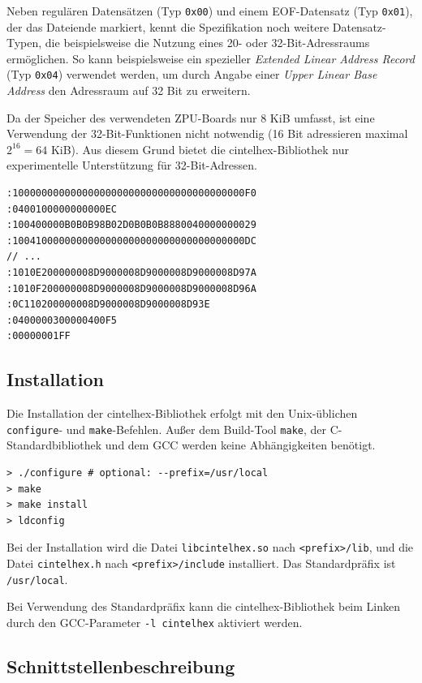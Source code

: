 \documentclass[11pt]{scrartcl}
\begin{document}
Neben regulären Datensätzen (Typ \texttt{0x00}) und einem EOF-Datensatz (Typ \texttt{0x01}), der das Dateiende markiert, kennt die Spezifikation noch weitere Datensatz-Typen, die beispielsweise die Nutzung eines 20- oder 32-Bit-Adressraums ermöglichen. So kann beispielsweise ein spezieller \emph{Extended Linear Address Record} (Typ \texttt{0x04}) verwendet werden, um durch Angabe einer \emph{Upper Linear Base Address} den Adressraum auf 32 Bit zu erweitern.

Da der Speicher des verwendeten ZPU-Boards nur 8 KiB umfasst, ist eine Verwendung der 32-Bit-Funktionen nicht notwendig (16 Bit adressieren maximal $2^{16} = 64$ KiB). Aus diesem Grund bietet die cintelhex-Bibliothek nur experimentelle Unterstützung für 32-Bit-Adressen.

\begin{lstlisting}[caption=Beispiel einer Intel HEX-Eingabedatei]
:1000000000000000000000000000000000000000F0
:0400100000000000EC
:100400000B0B0B98B02D0B0B0B8880040000000029
:1004100000000000000000000000000000000000DC
// ...
:1010E200000008D9000008D9000008D9000008D97A
:1010F200000008D9000008D9000008D9000008D96A
:0C110200000008D9000008D9000008D93E
:0400000300000400F5
:00000001FF
\end{lstlisting}

\subsection{Installation}

Die Installation der cintelhex-Bibliothek erfolgt mit den Unix-üblichen \texttt{configure}- und \texttt{make}-Befehlen. Außer dem Build-Tool \texttt{make}, der C-Standardbibliothek und dem GCC werden keine Abhängigkeiten benötigt.

\begin{lstlisting}[caption=Installation der cintelhex-Bibliothek]
> ./configure # optional: --prefix=/usr/local
> make
> make install
> ldconfig
\end{lstlisting}

Bei der Installation wird die Datei \texttt{libcintelhex.so} nach \texttt{<prefix>/lib}, und die Datei \texttt{cintelhex.h} nach \texttt{<prefix>/include} installiert. Das Standardpräfix ist \texttt{/usr/local}.

Bei Verwendung des Standardpräfix kann die cintelhex-Bibliothek beim Linken durch den GCC-Parameter \texttt{-l cintelhex} aktiviert werden.

\subsection{Schnittstellenbeschreibung}
\end{document}
